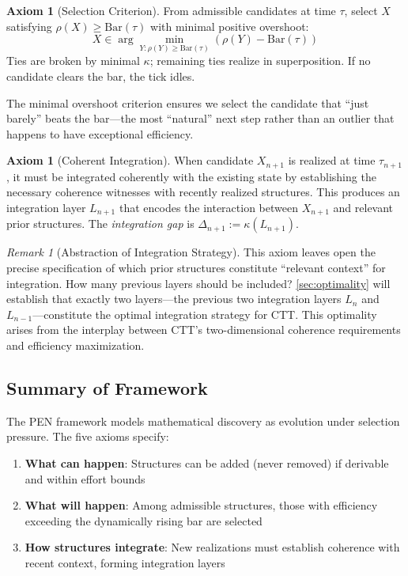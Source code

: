 \documentclass[11pt]{article}
\theoremstyle{definition}
\newtheorem{axiom}[theorem]{Axiom}
\theoremstyle{remark}
\newtheorem{remark}[theorem]{Remark}
\begin{document}
\begin{axiom}[Selection Criterion]
\label{ax:selection}
From admissible candidates at time $\tau$, select $X$ satisfying $\rho(X) \geq \mathrm{Bar}(\tau)$ with minimal positive overshoot:
\[
X \in \arg\min_{Y : \rho(Y) \geq \mathrm{Bar}(\tau)} (\rho(Y) - \mathrm{Bar}(\tau))
\]
Ties are broken by minimal $\kappa$; remaining ties realize in superposition. If no candidate clears the bar, the tick idles.
\end{axiom}

The minimal overshoot criterion ensures we select the candidate that ``just barely'' beats the bar---the most ``natural'' next step rather than an outlier that happens to have exceptional efficiency.

\begin{axiom}[Coherent Integration]
\label{ax:integration}
When candidate $X_{n+1}$ is realized at time $\tau_{n+1}$, it must be integrated coherently with the existing state by establishing the necessary coherence witnesses with recently realized structures. This produces an integration layer $L_{n+1}$ that encodes the interaction between $X_{n+1}$ and relevant prior structures. The \emph{integration gap} is $\Delta_{n+1} := \kappa(L_{n+1})$.
\end{axiom}

\begin{remark}[Abstraction of Integration Strategy]
\label{rem:integration-abstraction}
This axiom leaves open the precise specification of which prior structures constitute ``relevant context'' for integration. How many previous layers should be included? \cref{sec:optimality} will establish that exactly two layers---the previous two integration layers $L_n$ and $L_{n-1}$---constitute the optimal integration strategy for CTT. This optimality arises from the interplay between CTT's two-dimensional coherence requirements and efficiency maximization.
\end{remark}

\subsection{Summary of Framework}

The PEN framework models mathematical discovery as evolution under selection pressure. The five axioms specify:
\begin{enumerate}
\item \textbf{What can happen}: Structures can be added (never removed) if derivable and within effort bounds
\item \textbf{What will happen}: Among admissible structures, those with efficiency exceeding the dynamically rising bar are selected
\item \textbf{How structures integrate}: New realizations must establish coherence with recent context, forming integration layers
\end{enumerate}
\end{document}

